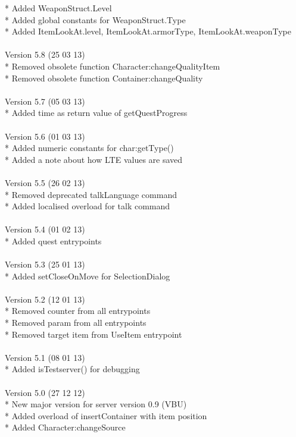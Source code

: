 \documentclass[a4paper,10pt,makeidx]{scrreprt}
\begin{document}
* Added WeaponStruct.Level\\
* Added global constants for WeaponStruct.Type\\
* Added ItemLookAt.level, ItemLookAt.armorType, ItemLookAt.weaponType\\
\\
Version 5.8 (25 03 13)\\
* Removed obsolete function Character:changeQualityItem\\
* Removed obsolete function Container:changeQuality\\
\\
Version 5.7 (05 03 13)\\
* Added time as return value of getQuestProgress\\
\\
Version 5.6 (01 03 13)\\
* Added numeric constants for char:getType()\\
* Added a note about how LTE values are saved\\
\\
Version 5.5 (26 02 13)\\
* Removed deprecated talkLanguage command\\
* Added localised overload for talk command\\
\\
Version 5.4 (01 02 13)\\
* Added quest entrypoints\\
\\
Version 5.3 (25 01 13)\\
* Added setCloseOnMove for SelectionDialog\\
\\
Version 5.2 (12 01 13)\\
* Removed counter from all entrypoints\\
* Removed param from all entrypoints\\
* Removed target item from UseItem entrypoint\\
\\
Version 5.1 (08 01 13)\\
* Added isTestserver() for debugging\\
\\
Version 5.0 (27 12 12)\\
* New major version for server version 0.9 (VBU)\\
* Added overload of insertContainer with item position\\
* Added Character:changeSource\\
\end{document}
